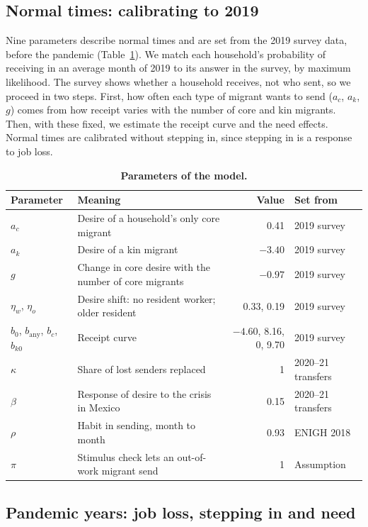 \documentclass[11pt]{article}
\begin{document}
\subsection{Normal times: calibrating to 2019}

Nine parameters describe normal times and are set from the 2019 survey data, before the pandemic (Table~\ref{tab:params}). We match each household's probability of receiving in an average month of 2019 to its answer in the survey, by maximum likelihood. The survey shows whether a household receives, not who sent, so we proceed in two steps. First, how often each type of migrant wants to send ($a_c$, $a_k$, $g$) comes from how receipt varies with the number of core and kin migrants. Then, with these fixed, we estimate the receipt curve and the need effects. Normal times are calibrated without stepping in, since stepping in is a response to job loss.

\begin{table}[ht]
\centering
\caption{\textbf{Parameters of the model.}}
\label{tab:params}
\begin{tabularx}{\linewidth}{lXrl}
\toprule
Parameter & Meaning & Value & Set from \\
\midrule
$a_c$ & Desire of a household's only core migrant & 0.41 & 2019 survey \\
$a_k$ & Desire of a kin migrant & $-3.40$ & 2019 survey \\
$g$ & Change in core desire with the number of core migrants & $-0.97$ & 2019 survey \\
$\eta_w$, $\eta_o$ & Desire shift: no resident worker; older resident & 0.33, 0.19 & 2019 survey \\
$b_0$, $b_{\mathrm{any}}$, $b_c$, $b_{k0}$ & Receipt curve & $-4.60$, 8.16, 0, 9.70 & 2019 survey \\
\midrule
$\kappa$ & Share of lost senders replaced & 1 & 2020--21 transfers \\
$\beta$ & Response of desire to the crisis in Mexico & 0.15 & 2020--21 transfers \\
$\rho$ & Habit in sending, month to month & 0.93 & ENIGH 2018 \\
\midrule
$\pi$ & Stimulus check lets an out-of-work migrant send & 1 & Assumption \\
\bottomrule
\end{tabularx}
\end{table}

\subsection{Pandemic years: job loss, stepping in and need}
\end{document}
